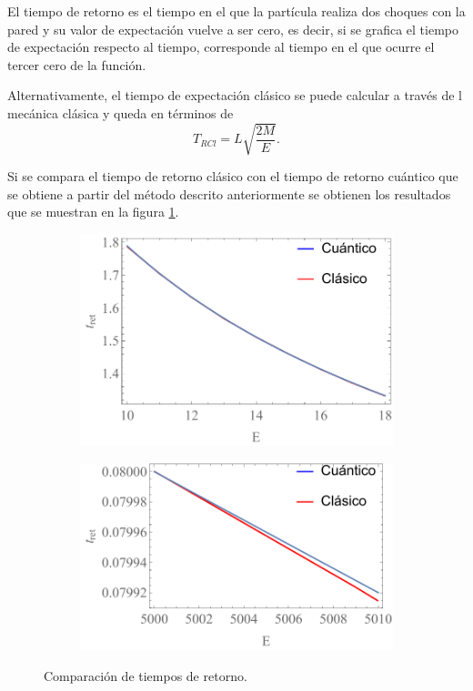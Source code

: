 \documentclass[letterpaper,11pt]{article}
\begin{document}
El tiempo de retorno es el tiempo en el que la partícula realiza dos choques con la pared y su valor de expectación vuelve a ser cero, es decir, si se grafica el tiempo de expectación respecto al tiempo, corresponde al tiempo en el que ocurre el tercer cero de la función.

Alternativamente, el tiempo de expectación clásico se puede calcular a través de l mecánica clásica y queda en términos de
\[
	T_{RCl} = L \sqrt{\frac{2M}{E}}.
\]

Si se compara el tiempo de retorno clásico con el tiempo de retorno cuántico que se obtiene a partir del método descrito anteriormente se obtienen los resultados que se muestran en la figura \ref{fig:tret}.

\begin{figure}[h!]
\begin{subfigure}{.5\textwidth}
	\centering
	\includegraphics[scale=0.60]{img/le}
\end{subfigure}%
\begin{subfigure}{.5\textwidth}
	\centering
	\includegraphics[scale=0.60]{img/he}
\end{subfigure}%
\caption{Comparación de tiempos de retorno.}
\label{fig:tret}
\end{figure}
\end{document}
